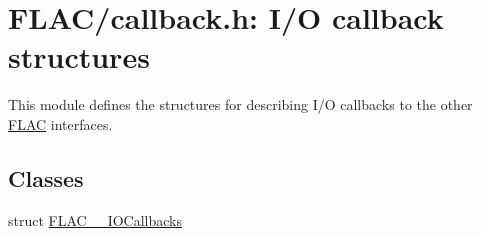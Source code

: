 \hypertarget{group__flac__callbacks}{}\section{F\+L\+A\+C/callback.h\+: I/O callback structures}
\label{group__flac__callbacks}


This module defines the structures for describing I/O callbacks to the other \hyperlink{namespace_f_l_a_c}{F\+L\+AC} interfaces.  


\subsection*{Classes}
\begin{DoxyCompactItemize}
\item 
struct \hyperlink{struct_f_l_a_c_____i_o_callbacks}{F\+L\+A\+C\+\_\+\+\_\+\+I\+O\+Callbacks}
\end{DoxyCompactItemize}
